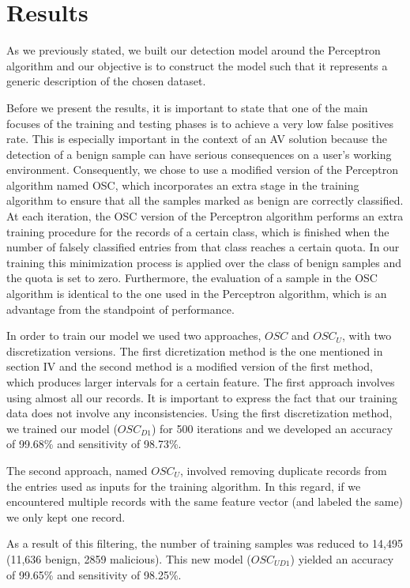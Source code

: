 \section{Results}
\par
As we previously stated, we built our detection model around the Perceptron algorithm and our objective is to construct the model such that it represents a generic description of the chosen dataset.
\par
Before we present the results, it is important to state that one of the main focuses of the training and testing phases is to achieve a very low false positives rate. This is especially important in the context of an AV solution because the detection of a benign sample can have serious consequences on a user's working environment. Consequently, we chose to use a modified version of the Perceptron algorithm named OSC, which incorporates an extra stage in the training algorithm to ensure that all the samples marked as benign are correctly classified. At each iteration, the OSC version of the Perceptron algorithm performs an extra training procedure for the records of a certain class, which is finished when the number of falsely classified entries from that class reaches a certain quota. In our training this minimization process is applied over the class of benign samples and the quota is set to zero. Furthermore, the evaluation of a sample in the OSC algorithm is identical to the one used in the Perceptron algorithm, which is an advantage from the standpoint of performance.
\par
In order to train our model we used two approaches, $OSC$ and $OSC_{U}$, with two discretization versions. The first dicretization method is the one mentioned in section IV and the second method is a modified version of the first method, which produces larger intervals for a certain feature. The first approach involves using almost all our records. It is important to express the fact that our training data does not involve any inconsistencies. Using the first discretization method, we trained our model ({$OSC_{D1}$}) for 500 iterations and we developed an accuracy of 99.68\% and sensitivity of 98.73\%. 
\par
The second approach, named $OSC_{U}$,  involved removing duplicate records from the entries used as inputs for the training algorithm. In this regard, if we encountered multiple records with the same feature vector (and labeled the same) we only kept one record.
\par
As a result of this filtering, the number of training samples was reduced to 14,495 (11,636 benign, 2859 malicious). This new model ({$OSC_{UD1}$}) yielded an accuracy of 99.65\% and sensitivity of 98.25\%.
